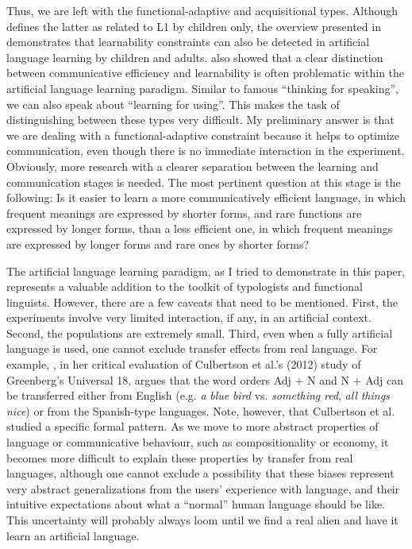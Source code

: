 \documentclass[output=paper]{langsci/langscibook}
\begin{document}
Thus, we are left with the functional-adaptive and acquisitional types. Although \citet{Haspelmath2019 (this volume)} defines the latter as related to L1 by children only, the overview presented in  demonstrates that learnability constraints can also be detected in artificial language learning by children and adults.  also showed that a clear distinction between communicative efficiency and learnability is often problematic within the artificial language learning paradigm. Similar to  famous “thinking for speaking”, we can also speak about “learning for using”. This makes the task of distinguishing between these types very difficult. My preliminary answer is that we are dealing with a functional-adaptive constraint because it helps to optimize communication, even though there is no immediate interaction in the experiment. Obviously, more research with a clearer separation between the learning and communication stages is needed. The most pertinent question at this stage is the following: Is it easier to learn a more communicatively efficient language, in which frequent meanings are expressed by shorter forms, and rare functions are expressed by longer forms, than a less efficient one, in which frequent meanings are expressed by longer forms and rare ones by shorter forms?

The artificial language learning paradigm, as I tried to demonstrate in this paper, represents a valuable addition to the toolkit of typologists and functional linguists. However, there are a few caveats that need to be mentioned. First, the experiments involve very limited interaction, if any, in an artificial context. Second, the populations are extremely small. Third, even when a fully artificial language is used, one cannot exclude transfer effects from real language. For example, \citet{Goldberg2013}, in her critical evaluation of Culbertson et al.’s (2012) study of Greenberg’s Universal 18, argues that the word orders Adj + N and N + Adj can be transferred either from English (e.g. \textit{a} \textit{blue} \textit{bird} vs. \textit{something} \textit{red}, \textit{all} \textit{things} \textit{nice}) or from the Spanish-type languages. Note, however, that Culbertson et al. studied a specific formal pattern. As we move to more abstract properties of language or communicative behaviour, such as compositionality or economy, it becomes more difficult to explain these properties by transfer from real languages, although one cannot exclude a possibility that these biases represent very abstract generalizations from the users’ experience with language, and their intuitive expectations about what a “normal” human language should be like. This uncertainty will probably always loom until we find a real alien and have it learn an artificial language. 
\end{document}
